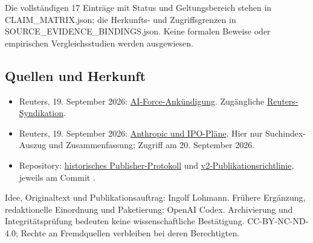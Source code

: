 \documentclass[11pt,a4paper]{article}
\begin{document}
{\small Die vollständigen 17 Einträge mit Status und Geltungsbereich stehen in CLAIM\_MATRIX.json; die Herkunfts- und Zugriffsgrenzen in SOURCE\_EVIDENCE\_BINDINGS.json. Keine formalen Beweise oder empirischen Vergleichsstudien werden ausgewiesen.\par}
\subsection*{Quellen und Herkunft}
\begingroup\small \begin{itemize}
\item Reuters, 19. September 2026: \href{https://www.reuters.com/world/us/trump-says-he-will-create-ai-force-name-ai-czar-2026-09-19/}{AI-Force-Ankündigung}. Zugängliche \href{https://www.marketscreener.com/news/trump-says-he-will-create-ai-force-name-ai-czar-ce785adad18cf425}{Reuters-Syndikation}.
\item Reuters, 19. September 2026: \href{https://www.reuters.com/business/anthropic-considers-releasing-new-ai-model-ahead-ipo-sources-say-2026-09-19/}{Anthropic und IPO-Pläne}. Hier nur Suchindex-Auszug und Zusammenfassung; Zugriff am 20. September 2026.
\item Repository: \href{https://github.com/Goldkelch/qik-vrt/blob/4c11b3f5c4ceb8f985c23d5d8bba852fd2014e5a/release/schrittweise-erkenntnis-2026-09-20-v1/PUBLICATION_EXECUTION_STATUS.json}{historisches Publisher-Protokoll} und \href{https://github.com/Goldkelch/qik-vrt/blob/4c11b3f5c4ceb8f985c23d5d8bba852fd2014e5a/policy/zenodo-machine-proof-policy-v2.json}{v2-Publikationsrichtlinie}, jeweils am Commit .
\end{itemize}\endgroup

{\footnotesize Idee, Originaltext und Publikationsauftrag: Ingolf Lohmann. Frühere Ergänzung, redaktionelle Einordnung und Paketierung: OpenAI Codex. Archivierung und Integritätsprüfung bedeuten keine wissenschaftliche Bestätigung. CC-BY-NC-ND-4.0; Rechte an Fremdquellen verbleiben bei deren Berechtigten.\par}
\end{document}
